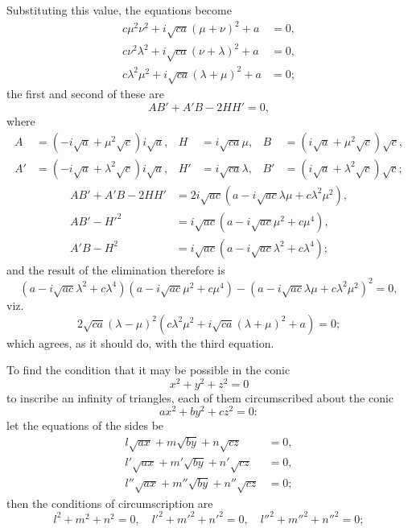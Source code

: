 \documentclass[11pt,a4paper]{book}
\begin{document}
{{Substituting this value, the equations become
\begin{align*}
c\mu^2\nu^2 + i\sqrt{ca}(\mu+\nu)^2 + a &= 0, \\
c\nu^2\lambda^2 + i\sqrt{ca}(\nu+\lambda)^2 + a &= 0, \\
c\lambda^2\mu^2 + i\sqrt{ca}(\lambda+\mu)^2 + a &= 0;
\end{align*}
the first and second of these are
\[
AB' + A'B - 2HH' = 0,
\]
where
\begin{align*}
A &= (-i\sqrt{a} + \mu^2\sqrt{c})i\sqrt{a}, & H &= i\sqrt{ca}\mu, & B &= (i\sqrt{a} + \mu^2\sqrt{c})\sqrt{c}, \\
A' &= (-i\sqrt{a} + \lambda^2\sqrt{c})i\sqrt{a}, & H' &= i\sqrt{ca}\lambda, & B' &= (i\sqrt{a} + \lambda^2\sqrt{c})\sqrt{c};
\end{align*}
\begin{align*}
AB' + A'B - 2HH' &= 2i\sqrt{ac}(a - i\sqrt{ac}\lambda\mu + c\lambda^2\mu^2), \\
AB' - H'^2 &= i\sqrt{ac}(a - i\sqrt{ac}\mu^2 + c\mu^4), \\
A'B - H^2 &= i\sqrt{ac}(a - i\sqrt{ac}\lambda^2 + c\lambda^4);
\end{align*}
and the result of the elimination therefore is
\[
(a - i\sqrt{ac}\lambda^2 + c\lambda^4)(a - i\sqrt{ac}\mu^2 + c\mu^4) - (a - i\sqrt{ac}\lambda\mu + c\lambda^2\mu^2)^2 = 0,
\]
viz.
\[
2\sqrt{ca}(\lambda - \mu)^2(c\lambda^2\mu^2 + i\sqrt{ca}(\lambda+\mu)^2 + a) = 0;
\]
which agrees, as it should do, with the third equation.

To find the condition that it may be possible in the conic
\[
x^2 + y^2 + z^2 = 0
\]
to inscribe an infinity of triangles, each of them circumscribed about the conic
\[
ax^2 + by^2 + cz^2 = 0:
\]
let the equations of the sides be
\begin{align*}
l\sqrt{ax} + m\sqrt{by} + n\sqrt{cz} &= 0, \\
l'\sqrt{ax} + m'\sqrt{by} + n'\sqrt{cz} &= 0, \\
l''\sqrt{ax} + m''\sqrt{by} + n''\sqrt{cz} &= 0;
\end{align*}
then the conditions of circumscription are
\[
l^2 + m^2 + n^2 = 0, \quad l'^2 + m'^2 + n'^2 = 0, \quad l''^2 + m''^2 + n''^2 = 0;
\]

}}
\end{document}
